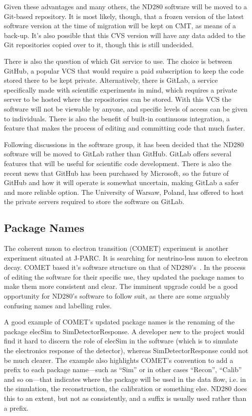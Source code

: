 \documentclass[aps,pra,12pt,notitlepage,tightenlines]{revtex4-1}
\begin{document}
Given these advantages and many others, the ND280 software will be moved to a Git-based repository. It is most likely, though, that a frozen version of the latest software version at the time of migration will be kept on CMT, as means of a back-up. It's also possible that this CVS version will have any data added to the Git repositories copied over to it, though this is still undecided.

There is also the question of which Git service to use. The choice is between GitHub, a popular VCS that would require a paid subscription to keep the code stored there to be kept private. Alternatively, there is GitLab, a service specifically made with scientific experiments in mind, which requires a private server to be hosted where the repositories can be stored. With this VCS the software will not be viewable by anyone, and specific levels of access can be given to individuals. There is also the benefit of built-in continuous integration, a feature that makes the process of editing and committing code that much faster.

Following discussions in the software group, it has been decided that the ND280 software will be moved to GitLab rather than GitHub. GitLab offers several features that will be useful for scientific code development. There is also the recent news that GitHub has been purchased by Microsoft, so the future of GitHub and how it will operate is somewhat uncertain, making GitLab a safer and more reliable option. The University of Warsaw, Poland, has offered to host the private servers required to store the software on GitLab.

\subsection{Package Names}
The coherent muon to electron transition (COMET) experiment is another experiment situated at J-PARC. It is searching for neutrino-less muon to electron decay. COMET based it's software structure on that of ND280's~\cite{Wu2017}. In the process of editing the software for their specific use, they updated the package names to make them more consistent and clear. The imminent upgrade could be a good opportunity for ND280's software to follow suit, as there are some arguably confusing names and labelling rules.

A good example of COMET's updated package names is the renaming of the package elecSim to SimDetectorResponse. A developer new to the project would find it hard to discern the role of elecSim in the software (which is to simulate the electronics response of the detector), whereas SimDetectorResponse could not be much clearer. The example also highlights COMET's convention to add a prefix to each package name---such as ``Sim'' or in other cases ``Recon'', ``Calib'' and so on---that indicates where the package will be used in the data flow, i.e. in the simulation, the reconstruction, the calibration or something else. ND280 does this to an extent, but not as consistently, and a suffix is usually used rather than a prefix. 
\end{document}
